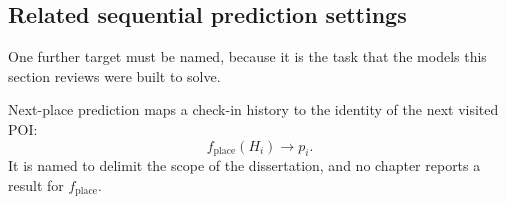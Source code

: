 \subsection{Related sequential prediction settings}

One further target must be named, because it is the task that the models this section
reviews were built to solve.

\begin{definition}\label{def:fund:nextplace}
    Next-place prediction maps a check-in history to the identity of the next visited POI:
    \begin{equation}
        f_{\mathrm{place}}(H_i)\longrightarrow p_i.
    \end{equation}
    It is named to delimit the scope of the dissertation, and no chapter reports a result
    for $f_{\mathrm{place}}$.
\end{definition}

